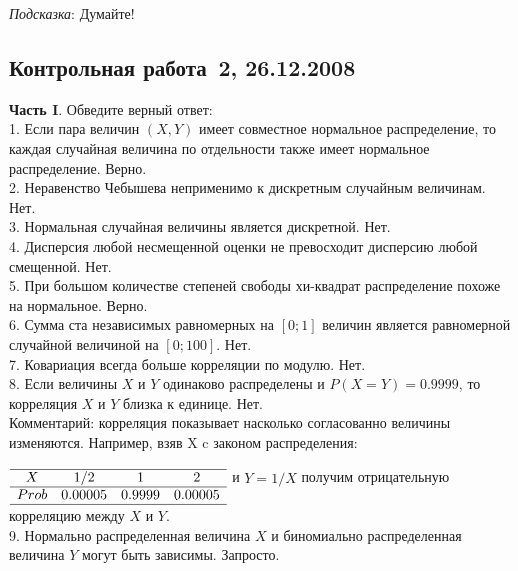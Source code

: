 \documentclass[pdftex,12pt,a4paper]{article}
\begin{document}
\emph{Подсказка}: Думайте! \\

\subsection{Контрольная работа \No\,2, 26.12.2008}

\textbf{Часть I}. Обведите верный ответ: \\

1. Если пара величин $(X,Y)$ имеет совместное нормальное распределение, то каждая случайная величина по отдельности также имеет нормальное распределение. Верно. \\

2. Неравенство Чебышева неприменимо к дискретным случайным величинам. Нет. \\

3. Нормальная случайная величины является дискретной. Нет.
\\

4. Дисперсия любой несмещенной оценки не превосходит дисперсию любой смещенной. Нет. \\

5. При большом количестве степеней свободы хи-квадрат распределение похоже на нормальное. Верно. \\

6. Сумма ста независимых равномерных на $[0;1]$ величин является равномерной случайной величиной на $[0;100]$. Нет. \\

7. Ковариация всегда больше корреляции по модулю.  Нет. \\

8. Если величины $X$ и $Y$ одинаково распределены и $P(X=Y)=0.9999$, то корреляция $X$ и $Y$ близка к единице. Нет. \\
Комментарий: корреляция показывает насколько согласованно величины изменяются. Например, взяв X c законом распределения: \\
$\begin{array}{cccc} \\
\hline
X & 1/2 & 1 & 2 \\
\hline
Prob & 0.00005 & 0.9999 & 0.00005 \\
\hline
\end{array}$
и $Y=1/X$ получим отрицательную корреляцию между $X$ и $Y$. \\

9. Нормально распределенная величина $X$ и биномиально распределенная величина $Y$ могут быть зависимы. Запросто. \\
\end{document}
